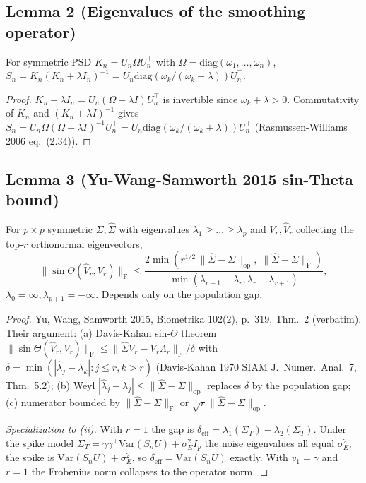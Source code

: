 \subsection*{Lemma 2 (Eigenvalues of the smoothing operator)}

\begin{lemma}\label{lem:smoother-eig}
For symmetric PSD $K_n=U_n\Omega U_n^\top$ with $\Omega=\mathrm{diag}(\omega_1,\dots,\omega_n)$,
$S_n=K_n(K_n+\lambda I_n)^{-1}=U_n\mathrm{diag}(\omega_k/(\omega_k+\lambda))U_n^\top$.
\end{lemma}

\begin{proof}
$K_n+\lambda I_n=U_n(\Omega+\lambda I)U_n^\top$ is invertible since $\omega_k+\lambda>0$.
Commutativity of $K_n$ and $(K_n+\lambda I)^{-1}$ gives
$S_n=U_n\Omega(\Omega+\lambda I)^{-1}U_n^\top=U_n\mathrm{diag}(\omega_k/(\omega_k+\lambda))U_n^\top$
(Rasmussen-Williams 2006 eq.~(2.34)).
\end{proof}

\subsection*{Lemma 3 (Yu-Wang-Samworth 2015 sin-Theta bound)}

\begin{lemma}\label{lem:yws}
For $p\times p$ symmetric $\Sigma,\widehat\Sigma$ with eigenvalues
$\lambda_1\ge\dots\ge\lambda_p$ and $V_r,\widehat V_r$ collecting the top-$r$
orthonormal eigenvectors,
\begin{equation}\label{eq:yws}
\|\sin\Theta(\widehat V_r,V_r)\|_{\mathrm F}
\le\frac{2\min(r^{1/2}\,\|\widehat\Sigma-\Sigma\|_{\mathrm{op}},\;\|\widehat\Sigma-\Sigma\|_{\mathrm F})}
     {\min(\lambda_{r-1}-\lambda_r,\lambda_r-\lambda_{r+1})},
\end{equation}
$\lambda_0=\infty,\lambda_{p+1}=-\infty$. Depends only on the population gap.
\end{lemma}

\begin{proof}
Yu, Wang, Samworth 2015, Biometrika 102(2), p.~319, Thm.~2 (verbatim). Their
argument: (a) Davis-Kahan sin-$\Theta$ theorem
$\|\sin\Theta(\widehat V_r,V_r)\|_{\mathrm F}\le\|\widehat\Sigma V_r-V_r\Lambda_r\|_{\mathrm F}/\delta$
with $\delta=\min(|\widehat\lambda_j-\lambda_k|:j\le r,k>r)$ (Davis-Kahan 1970
SIAM J.\ Numer.\ Anal.~7, Thm.~5.2); (b) Weyl
$|\widehat\lambda_j-\lambda_j|\le\|\widehat\Sigma-\Sigma\|_{\mathrm{op}}$
replaces $\delta$ by the population gap; (c) numerator bounded by
$\|\widehat\Sigma-\Sigma\|_{\mathrm F}$ or $\sqrt r\|\widehat\Sigma-\Sigma\|_{\mathrm{op}}$.

\emph{Specialization to (ii).} With $r=1$ the gap is
$\delta_{\mathrm{eff}}=\lambda_1(\Sigma_T)-\lambda_2(\Sigma_T)$. Under the spike
model $\Sigma_T=\gamma\gamma^\top\mathrm{Var}(S_nU)+\sigma_E^2 I_p$ the noise
eigenvalues all equal $\sigma_E^2$, the spike is $\mathrm{Var}(S_nU)+\sigma_E^2$,
so $\delta_{\mathrm{eff}}=\mathrm{Var}(S_nU)$ exactly. With $v_1=\gamma$ and
$r=1$ the Frobenius norm collapses to the operator norm.
\end{proof}

